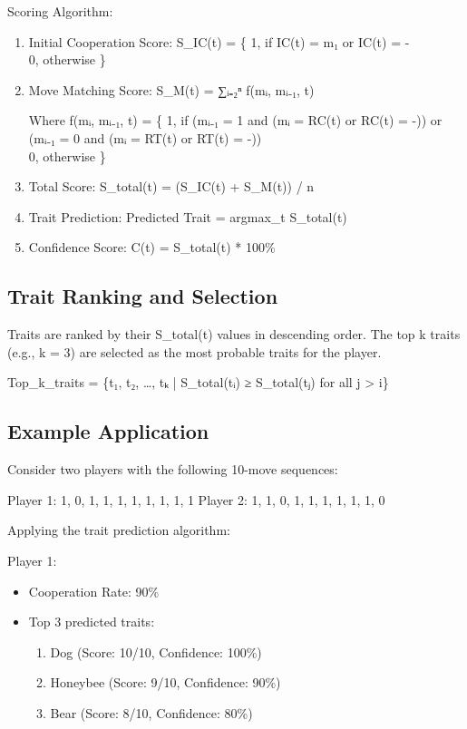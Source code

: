 \documentclass[]{article}
\begin{document}
Scoring Algorithm:

\begin{enumerate}
\item Initial Cooperation Score: S\_IC(t) = \{ 1, if IC(t) = m₁ or IC(t) = - \\ 0, otherwise \}
\item Move Matching Score: S\_M(t) = ∑ᵢ₌₂ⁿ f(mᵢ, mᵢ₋₁, t)

  Where f(mᵢ, mᵢ₋₁, t) = \{ 1, if (mᵢ₋₁ = 1 and (mᵢ = RC(t) or RC(t) = -)) or (mᵢ₋₁ = 0 and (mᵢ = RT(t) or RT(t) = -)) \\ 0, otherwise \}
\item Total Score: S\_total(t) = (S\_IC(t) + S\_M(t)) / n
\item Trait Prediction: Predicted Trait = argmax\_t S\_total(t)
\item Confidence Score: C(t) = S\_total(t) * 100\%
\end{enumerate}

\subsection{Trait Ranking and Selection}

Traits are ranked by their S\_total(t) values in descending order. The top k traits (e.g., k = 3) are selected as the most probable traits for the player.

Top\_k\_traits = \{t₁, t₂, \ldots, tₖ | S\_total(tᵢ) ≥ S\_total(tⱼ) for all j > i\}

\subsection{Example Application}

Consider two players with the following 10-move sequences:

Player 1: 1, 0, 1, 1, 1, 1, 1, 1, 1, 1
Player 2: 1, 1, 0, 1, 1, 1, 1, 1, 1, 0

Applying the trait prediction algorithm:

Player 1:
\begin{itemize}
\item Cooperation Rate: 90\%
\item Top 3 predicted traits:
  \begin{enumerate}
  \item Dog (Score: 10/10, Confidence: 100\%)
  \item Honeybee (Score: 9/10, Confidence: 90\%)
  \item Bear (Score: 8/10, Confidence: 80\%)
  \end{enumerate}
\end{itemize}
\end{document}
